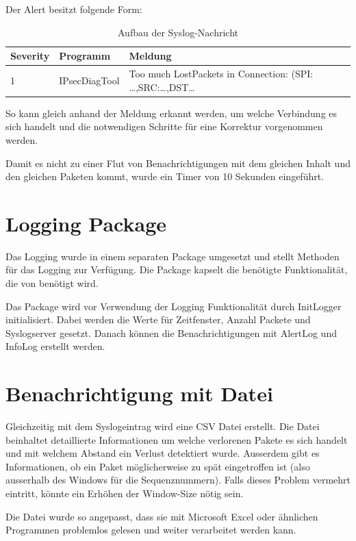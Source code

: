 \noindent Der Alert besitzt folgende Form:

\begin{table}[H]
\begin{tabularx}{\textwidth}{l|l|>{\raggedright\arraybackslash}X} 
\textbf{Severity} & \textbf{Programm} & \textbf{Meldung}\\ 
\hline
1 & IPsecDiagTool & Too much LostPackets in Connection: (SPI: \dots ,SRC:\dots ,DST\dots
\end{tabularx}
\caption{Aufbau der Syslog-Nachricht}
\end{table}

\noindent So kann gleich anhand der Meldung erkannt werden, um welche Verbindung es sich handelt und die notwendigen Schritte für eine Korrektur vorgenommen werden.

\noindent Damit es nicht zu einer Flut von Benachrichtigungen mit dem gleichen Inhalt und den gleichen Paketen kommt, wurde ein Timer von 10 Sekunden eingeführt.

\section{ Logging Package}

\noindent Das Logging wurde in einem separaten Package umgesetzt und stellt Methoden für das Logging zur Verfügung. Die Package kapselt die benötigte Funktionalität, die von  benötigt wird.

\noindent Das Package wird vor Verwendung der Logging Funktionalität durch InitLogger initialisiert. Dabei werden die Werte für Zeitfenster, Anzahl Packete und Syslogserver gesetzt. Danach können die Benachrichtigungen mit AlertLog und InfoLog erstellt werden.

\section{ Benachrichtigung mit Datei}

\noindent Gleichzeitig mit dem Syslogeintrag wird eine CSV Datei erstellt. Die Datei beinhaltet detaillierte Informationen um welche verlorenen Pakete es sich handelt und mit welchem Abstand ein Verlust detektiert wurde. Ausserdem gibt es Informationen, ob ein Paket möglicherweise zu spät eingetroffen ist (also ausserhalb des Windows für die Sequenznummern). Falls dieses Problem vermehrt eintritt, könnte ein Erhöhen der Window-Size nötig sein.

\noindent Die Datei wurde so angepasst, dass sie mit Microsoft Excel oder ähnlichen Programmen problemlos gelesen und weiter verarbeitet werden kann.

